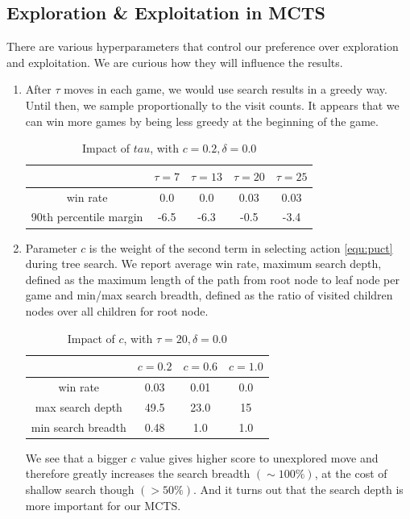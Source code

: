 \documentclass{article}
\begin{document}
\subsection{Exploration \& Exploitation in MCTS}
\label{sec:ee}
There are various hyperparameters that control our preference over exploration and exploitation. We are curious how they will influence the results.
\begin{enumerate}
  \item
    After $\tau$ moves in each game, we would use search results in a greedy way. Until then, we sample proportionally to the visit counts. It appears that we can win more games by being less greedy at the beginning of the game.

\begin{table}[ht]
  \caption{Impact of $tau$, with $c=0.2, \delta=0.0$}
  \label{tbl:mctstao}
  \centering
  \begin{tabular}{c | c | c | c | c}
    &  $\tau=7$ & $\tau=13$ & $\tau=20$ & $\tau =25$ \\
    \hline
    win rate            & 0.0  & 0.0  & 0.03 & 0.03 \\
    90th percentile margin & -6.5  & -6.3  & -0.5 & -3.4 \\
  \end{tabular}
\end{table}

  \item
    Parameter $c$ is the weight of the second term in selecting action \ref{equ:puct} during tree search. We report average win rate, maximum search depth, defined as the maximum length of the path from root node to leaf node per game and min/max search breadth, defined as the ratio of visited children nodes over all children for root node.
\begin{table}[ht]
  \caption{Impact of $c$, with $\tau=20, \delta=0.0$}
  \label{tbl:mctsc}
  \centering
  \begin{tabular}{c | c | c | c}
    &  $c=0.2$ & $c=0.6$ & $c=1.0$ \\
    \hline
    win rate            &  0.03 & 0.01 & 0.0    \\
    max search depth    & 49.5  & 23.0 & 15   \\
    min search breadth  & 0.48  & 1.0  & 1.0     \\
  \end{tabular}
\end{table}
We see that a bigger $c$ value gives higher score to unexplored move and therefore greatly increases the search breadth $(\sim 100\%)$, at the cost of shallow search though $(> 50\%)$. And it turns out that the search depth is more important for our MCTS.

\end{enumerate}
\end{document}
